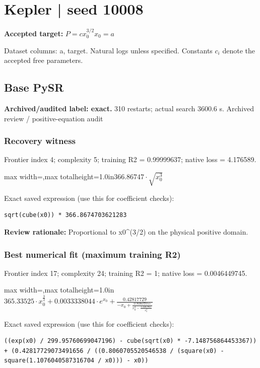 \documentclass[10pt,letterpaper,landscape]{article}
\begin{document}
\section*{Kepler | seed 10008}
\textbf{Accepted target:} $\displaystyle P=c x_0^{3/2}$\hfill $x_0=a$\par
{\small Dataset columns: a, target. Natural logs unless specified. Constants $c_i$ denote the accepted free parameters.}\par\medskip
\begin{minipage}[t]{0.485\textwidth}
\subsection*{Base PySR}
\textbf{Archived/audited label: exact.} 310 restarts; actual search 3600.6 s.
{\small Archived review / positive-equation audit}
\subsubsection*{Recovery witness}
Frontier index 4; complexity 5; training R2 = 0.99999637; native loss = 4.176589.
\begin{center}\begin{adjustbox}{max width=\linewidth,max totalheight=1.0in}$\displaystyle 366.86747 \cdot \sqrt{x_{0}^{3}}$\end{adjustbox}\end{center}
{\scriptsize Exact saved expression (use this for coefficient checks):}
\begin{lstlisting}
sqrt(cube(x0)) * 366.8674703621283
\end{lstlisting}
{\small\textbf{Review rationale:} Proportional to x0\textasciicircum{}(3/2) on the physical positive domain.}
\subsubsection*{Best numerical fit (maximum training R2)}
Frontier index 17; complexity 24; training R2 = 1; native loss = 0.0046449745.
\begin{center}\begin{adjustbox}{max width=\linewidth,max totalheight=1.0in}$\displaystyle 365.33525 \cdot x_{0}^{\frac{3}{2}} + 0.0033338044 \cdot e^{x_{0}} + \frac{0.42817729}{- x_{0} + \frac{0.80607055}{x_{0}^{2} - \frac{1.2267867}{x_{0}^{2}}}}$\end{adjustbox}\end{center}
{\scriptsize Exact saved expression (use this for coefficient checks):}
\begin{lstlisting}
((exp(x0) / 299.95760699047196) - cube(sqrt(x0) * -7.148756864453367)) + (0.42817729073491656 / ((0.8060705520546538 / (square(x0) - square(1.1076040587316704 / x0))) - x0))
\end{lstlisting}
\end{minipage}\hfill
\end{document}
